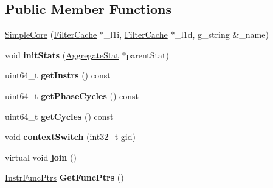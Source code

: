 \subsection*{Public Member Functions}
\begin{DoxyCompactItemize}
\item 
\hyperlink{classSimpleCore_ae992e18b5545a5fe7ca9d6fa43a36932}{Simple\-Core} (\hyperlink{classFilterCache}{Filter\-Cache} $\ast$\-\_\-l1i, \hyperlink{classFilterCache}{Filter\-Cache} $\ast$\-\_\-l1d, g\-\_\-string \&\-\_\-name)
\item 
\hypertarget{classSimpleCore_a5db49b68ee160b1418eb4c262066d2d1}{void {\bfseries init\-Stats} (\hyperlink{classAggregateStat}{Aggregate\-Stat} $\ast$parent\-Stat)}\label{classSimpleCore_a5db49b68ee160b1418eb4c262066d2d1}

\item 
\hypertarget{classSimpleCore_aa33458c4e3e7416b2a67e32e4e32c29a}{uint64\-\_\-t {\bfseries get\-Instrs} () const }\label{classSimpleCore_aa33458c4e3e7416b2a67e32e4e32c29a}

\item 
\hypertarget{classSimpleCore_a57f7cf471b24d6065440a899baa094ae}{uint64\-\_\-t {\bfseries get\-Phase\-Cycles} () const }\label{classSimpleCore_a57f7cf471b24d6065440a899baa094ae}

\item 
\hypertarget{classSimpleCore_aea774d383151fc05d7fe103b42644190}{uint64\-\_\-t {\bfseries get\-Cycles} () const }\label{classSimpleCore_aea774d383151fc05d7fe103b42644190}

\item 
\hypertarget{classSimpleCore_a5071765de0587bf3b1ba82426b52495e}{void {\bfseries context\-Switch} (int32\-\_\-t gid)}\label{classSimpleCore_a5071765de0587bf3b1ba82426b52495e}

\item 
\hypertarget{classSimpleCore_a7deefaff4521f45ddf4235b1227af7cc}{virtual void {\bfseries join} ()}\label{classSimpleCore_a7deefaff4521f45ddf4235b1227af7cc}

\item 
\hypertarget{classSimpleCore_a13b9b2ff6c41dbca39845fd66daf0a1f}{\hyperlink{structInstrFuncPtrs}{Instr\-Func\-Ptrs} {\bfseries Get\-Func\-Ptrs} ()}\label{classSimpleCore_a13b9b2ff6c41dbca39845fd66daf0a1f}

\end{DoxyCompactItemize}
